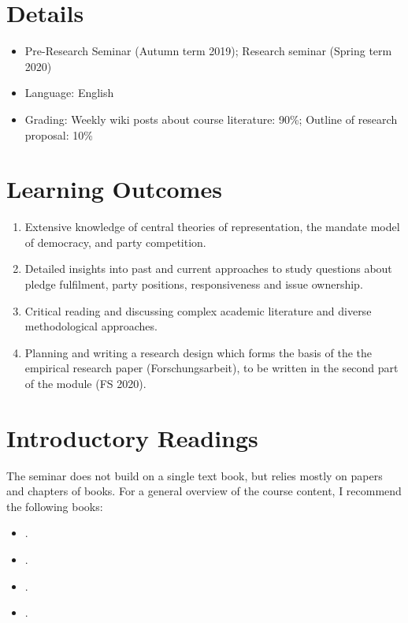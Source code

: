 \documentclass[abstract=on,parskip=full,headings=standardclasses,fontsize=11pt,paper=a4]{scrartcl}
\begin{document}
\section*{Details}

\begin{itemize}
\item Pre-Research Seminar (Autumn term 2019); Research seminar (Spring term 2020)
\item  Language: English
\item Grading: Weekly wiki posts about course literature: 90\%;  Outline of research proposal: 10\%
\end{itemize}

\section*{Learning Outcomes}

\begin{enumerate}
\item Extensive knowledge of central theories of representation, the mandate model of democracy, and party competition. 
\item Detailed insights into past and current approaches to study questions about pledge fulfilment, party positions, responsiveness and issue ownership.
\item Critical reading and discussing  complex academic literature and diverse methodological approaches.
\item Planning and writing a research design which forms the basis of the the empirical research paper (Forschungsarbeit), to be written in the second part of the module (FS 2020).
\end{enumerate}

\section*{Introductory Readings}

The seminar does not build on a single text book, but relies mostly on papers and chapters of books. For  a general overview of the course content, I recommend the following books:

\begin{itemize}
\item {}.
\item {}.
\item {}.
\item {}.
\end{itemize}
\end{document}
